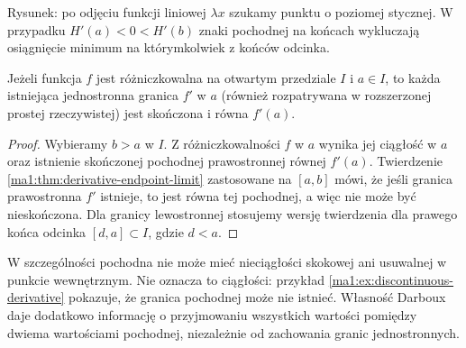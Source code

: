\begin{center}

\small Rysunek: po odjęciu funkcji liniowej $\lambda x$ szukamy punktu o poziomej stycznej. W przypadku $H'(a)<0<H'(b)$ znaki pochodnej na końcach wykluczają osiągnięcie minimum na którymkolwiek z końców odcinka.
\end{center}

\begin{wniosek}
\label{ma1:cor:derivative-no-jumps}
Jeżeli funkcja $f$ jest różniczkowalna na otwartym przedziale $I$ i $a\in I$, to każda istniejąca jednostronna granica $f'$ w $a$ (również rozpatrywana w rozszerzonej prostej rzeczywistej) jest skończona i równa $f'(a)$.
\end{wniosek}
\begin{proof}
Wybieramy $b>a$ w $I$. Z różniczkowalności $f$ w $a$ wynika jej ciągłość w $a$ oraz istnienie skończonej pochodnej prawostronnej równej $f'(a)$. Twierdzenie \ref{ma1:thm:derivative-endpoint-limit} zastosowane na $[a,b]$ mówi, że jeśli granica prawostronna $f'$ istnieje, to jest równa tej pochodnej, a więc nie może być nieskończona. Dla granicy lewostronnej stosujemy wersję twierdzenia dla prawego końca odcinka $[d,a]\subset I$, gdzie $d<a$.
\end{proof}
W szczególności pochodna nie może mieć nieciągłości skokowej ani usuwalnej w punkcie wewnętrznym. Nie oznacza to ciągłości: przykład \ref{ma1:ex:discontinuous-derivative} pokazuje, że granica pochodnej może nie istnieć. Własność Darboux daje dodatkowo informację o przyjmowaniu wszystkich wartości pomiędzy dwiema wartościami pochodnej, niezależnie od zachowania granic jednostronnych.

